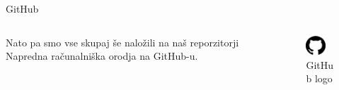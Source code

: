 \documentclass{beamer}
\begin{document}
\begin{frame}{GitHub}
\begin{columns}
\begin{column}{0.5\textwidth}
        Nato pa smo vse skupaj še naložili na naš reporzitorji Napredna računalniška orodja na GitHub-u.
\end{column}
\begin{column}{0.5\textwidth}
    \begin{figure}
    \centering
        \includegraphics[width=0.7\textwidth]{github.png}
        \caption{GitHub logo}
    \end{figure}
\end{column}
\end{columns}
\end{frame}
\end{document}
